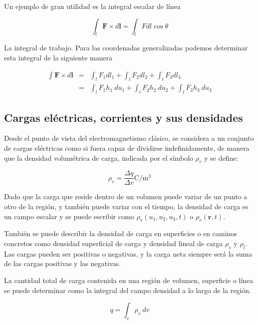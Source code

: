 Un ejemplo de gran utilidad es la integral escalar de línea 

\begin{equation*}
\int_l \mathbf{F} \times d \mathbf{l} = \int_l F dl \cos \theta
\end{equation*}

La integral de trabajo. Para las coordenadas generalizadas podemos determinar esta integral de la siguiente manera

\begin{eqnarray*}
\int \mathbf{F} \times d \mathbf{l} &=& \int_l F_1 dl_1 + \int_l F_2 d l_2 + \int_l F_3 d l_3 \\
&=& \int_l F_1 h_1 \ du_1 + \int_l F_2 h_2 \ du_2 + \int_l F_3 h_3 \ du_3
\end{eqnarray*}

\subsection{Cargas eléctricas, corrientes y sus densidades}

Desde el punto de vista del electromagnetismo clásico, se considera a un conjunto de cargas eléctricas como si fuera capaz de dividirse indefinidamente, de manera que la densidad volumétrica de carga, indicada por el símbolo $\rho_v$ y se define:

\begin{equation*}
\rho_v = \frac{\Delta q}{\Delta v} \text{C}/\text{m}^3
\end{equation*}

Dado que la carga que reside dentro de un volumen puede variar de un punto a otro de la región, y también puede variar con el tiempo, la densidad de carga es un campo escalar y se puede escribir como $\rho_v(u_1,u_2,u_3,t)$ o $\rho_v(\mathbf{r},t)$.

También se puede describir la densidad de carga en superficies o en caminos concretos como densidad superficial de carga y densidad lineal de carga $\rho_s$ y $\rho_l$. Las cargas pueden ser  positivas o negativas, y la carga neta siempre será la suma de las cargas positivas y las negativas. 

La cantidad total de carga contenida en una región de volumen, superficie o línea se puede determinar como la integral del campo densidad a lo largo de la región.

\begin{equation*}
q = \int_v \rho_v \ dv
\end{equation*}

